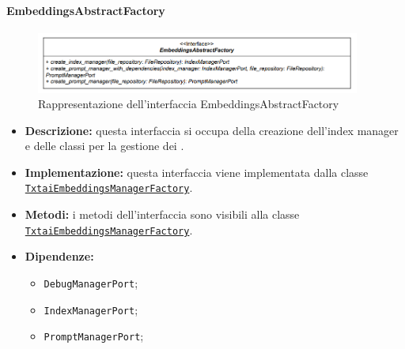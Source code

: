 \paragraph{EmbeddingsAbstractFactory} \label{EmbeddingsAbstractFactory}
\begin{figure}[H]
    \centering
    \includegraphics[width=0.95\textwidth]{assets/Backend/embeddings_abstract_factory.png}
    \caption{Rappresentazione dell'interfaccia EmbeddingsAbstractFactory}
  \end{figure}
\begin{itemize}
    \item \textbf{Descrizione:} questa interfaccia si occupa della creazione dell'index manager e delle classi per la gestione dei .
    \item \textbf{Implementazione:} questa interfaccia viene implementata dalla classe \hyperref[TxtaiEmbeddingsManagerFactory]{\texttt{TxtaiEmbeddingsManagerFactory}}.
    \item \textbf{Metodi:} i metodi dell'interfaccia sono visibili alla classe \hyperref[TxtaiEmbeddingsManagerFactory]{\texttt{TxtaiEmbeddingsManagerFactory}}.
    \item \textbf{Dipendenze:}
    \begin{itemize}
        \item \texttt{DebugManagerPort};
        \item \texttt{IndexManagerPort};
        \item \texttt{PromptManagerPort};
    \end{itemize}
\end{itemize}  

